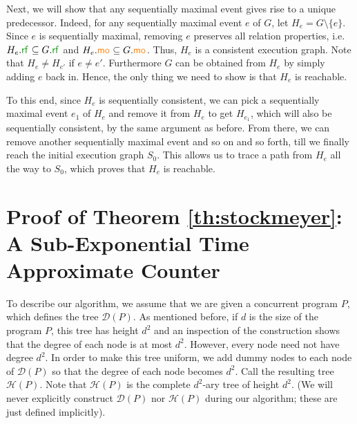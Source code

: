 \documentclass[acmsmall]{acmart}
\newcommand{\rf}[1]{{\textcolor{green!60!black}{\mathsf{rf}}_{#1}}}
\newcommand{\mo}[1]{{\textcolor{orange}{\mathsf{mo}}_{#1}}}
\begin{document}
Next, we will show that any sequentially maximal event gives rise to a unique predecessor. Indeed, for any sequentially maximal event $e$ of $G$, let $H_e = G \setminus \{e\}$. Since $e$ is sequentially maximal, removing 
$e$ preserves all relation properties, i.e. $H_e.\rf{} \subseteq G.\rf{}$ and $H_e.\mo{}\subseteq G.\mo{}$. Thus, $H_e$ is a consistent execution graph. Note that $H_e \neq H_{e'}$ if $e \neq e'$. Furthermore $G$ can be obtained from $H_e$ by simply adding $e$ back in. Hence, the only thing we need to show is that $H_e$ is reachable.

To this end, since $H_e$ is sequentially consistent, we can pick a sequentially maximal event $e_1$ of $H_e$ and remove it from $H_e$ to get $H_{e_1}$, which will also be sequentially consistent, by the same argument as before. From there, we can remove another sequentially maximal event and so on and so forth, till we finally reach the initial execution graph $S_0$. This allows us to trace a path from $H_e$ all the way to $S_0$,
which proves that $H_e$ is reachable.


\section{Proof of Theorem \ref{th:stockmeyer}: A Sub-Exponential Time Approximate Counter}
\label{sec:stockmeyer}


To describe our algorithm, we assume that we are given a concurrent program $P$, 
which defines the tree $\mathcal{D}(P)$. 
As mentioned before, if $d$ is the size of the program $P$, 
this tree has height $d^2$ and an inspection of the construction shows that the degree of each node is at most $d^2$. 
However, every node need not have degree $d^2$. In order to make this tree uniform, we add dummy nodes to each node of $\mathcal{D}(P)$ so that the degree of each node becomes $d^2$. 
Call the resulting tree $\mathcal{H}(P)$. Note that $\mathcal{H}(P)$ 
is the complete $d^2$-ary tree of height $d^2$. 
(We will never explicitly construct $\mathcal{D}(P)$ nor $\mathcal{H}(P)$ during our algorithm; 
these are just defined implicitly). 
\end{document}
